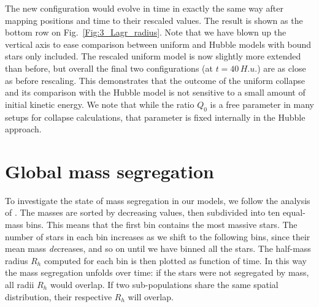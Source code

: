   The new configuration would evolve in time in exactly the same way after mapping positions and time to their rescaled values. The result is shown as the bottom row on Fig.~\ref{Fig:3_Lagr_radius}.  Note that we  have blown up the vertical axis to ease comparison between uniform and Hubble models with bound stars only included. The rescaled uniform model is now slightly more extended than before, but overall the final two configurations (at $t = 40 \,H.u.$) are as close as before rescaling. This demonstrates that  the outcome of the uniform collapse and its comparison with the Hubble model is not sensitive to a small amount of initial kinetic energy. We note that while the ratio $Q_0$ is a free parameter in many setups for collapse calculations, that parameter is fixed internally in the Hubble approach. 










\section{Global mass segregation}
\label{Sec:Segregation} 


To investigate the state of mass segregation in our models, we follow the analysis of \cite{Caputo2014}. The masses are sorted by decreasing values, then subdivided into ten equal-mass bins. This means that the first bin contains the most massive stars. The number of stars in each bin increases as we shift to the following bins, since their mean mass {\it de}creases, and so on until we have binned all the stars. The half-mass radius $R_h$ computed for each bin is then plotted as function of time. In this way the mass segregation unfolds over time: if the stars were not segregated by mass, all radii $R_h$ would overlap. If two sub-populations share the same spatial distribution, their respective $R_h$ will overlap.


